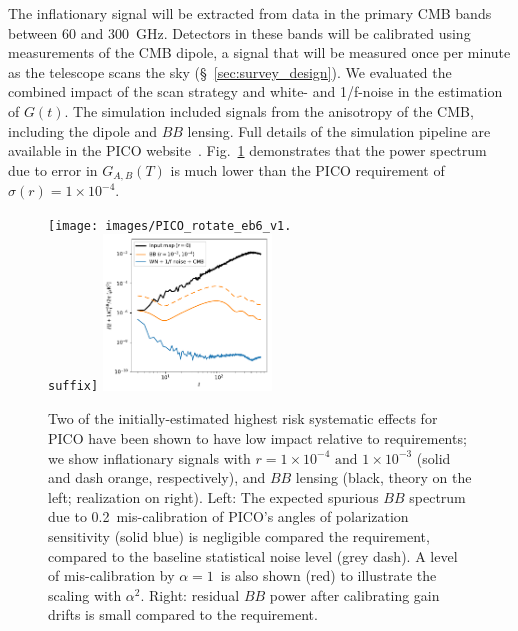 \documentclass[PICOReport.tex]{subfiles}
\begin{document}
The inflationary signal will be extracted from data in the primary CMB bands between 60 and 300~GHz. Detectors in these bands will be calibrated using measurements of the CMB dipole, a signal that will be measured once per minute as the telescope scans the sky (\S~\ref{sec:survey_design}).  We evaluated the combined impact of the scan strategy and white- and 1/f-noise in the estimation of $G(t)$.
The simulation included signals from the anisotropy of the CMB, including the dipole and $BB$ lensing. Full details of the simulation pipeline are available in the PICO website~\citep{pico_web}. Fig.~\ref{fig:rot_bb_tb_eb} demonstrates that the power spectrum due to error in $G_{A,B} (T)$ is much lower than the PICO requirement of $\sigma(r) = 1\times 10^{-4}$. 
\begin{figure}[thb]
\centerline{
\texttt{[image: images/PICO\_rotate\_eb6\_v1.\\suffix]} 
\hspace{0.3in}
\includegraphics[width=0.4\textwidth]{images/calibration_spectrum_BB.pdf} }
\vspace{-0.1in}
\caption{\captiontext
Two of the initially-estimated highest risk systematic effects for PICO have been shown to have low impact relative to requirements; we show inflationary signals with  $r = 1\times 10^{-4}\,\, \mbox{and} \,\, 1\times 10^{-3}$ (solid and dash orange, respectively), and $BB$ lensing (black, theory on the left; realization on right). Left: The expected spurious $BB$ spectrum due to 0.2\arcmin\ mis-calibration of PICO's angles of polarization sensitivity (solid blue) is negligible compared the requirement, compared to the baseline statistical noise level (grey dash). A level of mis-calibration by $\alpha = 1$\arcmin\ is also shown (red) to illustrate the scaling with $\alpha^{2}$. Right: residual $BB$ power after calibrating gain drifts is small compared to the requirement. 
\label{fig:rot_bb_tb_eb} }
\vspace{-0.1in}
\end{figure}
\end{document}
